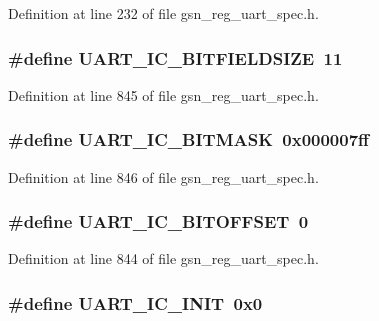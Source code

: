 Definition at line 232 of file gsn\_\-reg\_\-uart\_\-spec.h.

\hypertarget{a00575_a7e6aa79b0a67240ff8cb824cfdbc8853}{
\subsubsection[{UART\_\-IC\_\-BITFIELDSIZE}]{\setlength{\rightskip}{0pt plus 5cm}\#define UART\_\-IC\_\-BITFIELDSIZE~11}}
\label{a00575_a7e6aa79b0a67240ff8cb824cfdbc8853}


Definition at line 845 of file gsn\_\-reg\_\-uart\_\-spec.h.

\hypertarget{a00575_a5370c870f3543f45c172ec5e5405f527}{
\subsubsection[{UART\_\-IC\_\-BITMASK}]{\setlength{\rightskip}{0pt plus 5cm}\#define UART\_\-IC\_\-BITMASK~0x000007ff}}
\label{a00575_a5370c870f3543f45c172ec5e5405f527}


Definition at line 846 of file gsn\_\-reg\_\-uart\_\-spec.h.

\hypertarget{a00575_a55b75dd6c03b760f689b600ad5a16b77}{
\subsubsection[{UART\_\-IC\_\-BITOFFSET}]{\setlength{\rightskip}{0pt plus 5cm}\#define UART\_\-IC\_\-BITOFFSET~0}}
\label{a00575_a55b75dd6c03b760f689b600ad5a16b77}


Definition at line 844 of file gsn\_\-reg\_\-uart\_\-spec.h.

\hypertarget{a00575_a0f09e5d4226012597ce64537edcd8ebd}{
\subsubsection[{UART\_\-IC\_\-INIT}]{\setlength{\rightskip}{0pt plus 5cm}\#define UART\_\-IC\_\-INIT~0x0}}
\label{a00575_a0f09e5d4226012597ce64537edcd8ebd}


